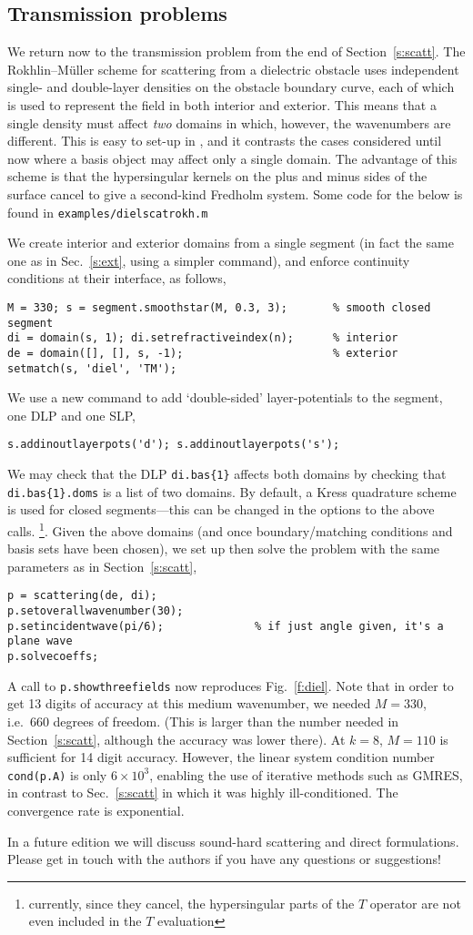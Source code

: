 \subsection{Transmission problems}
\label{s:trans}

We return now to the transmission problem from the end of Section~\ref{s:scatt}.
The Rokhlin--M\"{u}ller scheme \cite{rokh83}
for scattering from a dielectric obstacle
uses independent single- and double-layer densities on the obstacle
boundary curve, each of which is used to represent the field in
both interior and exterior.
This means that a single density must affect
{\em two} domains in which, however, the wavenumbers are different.
This is easy to set-up in \mpspack, and it contrasts the cases considered
until now where a basis object may affect only a single domain.
The advantage of this scheme is that
the hypersingular kernels on the plus and minus sides of the surface
cancel to give a second-kind Fredholm system.
Some code for the below is found in {\tt examples/dielscatrokh.m}

We create interior and exterior domains from a single segment
(in fact the same one as in Sec.~\ref{s:ext}, using a simpler
command), and
enforce continuity conditions at their interface, as follows,
\begin{verbatim}
M = 330; s = segment.smoothstar(M, 0.3, 3);       % smooth closed segment
di = domain(s, 1); di.setrefractiveindex(n);      % interior
de = domain([], [], s, -1);                       % exterior
setmatch(s, 'diel', 'TM');
\end{verbatim}
We use a new command to add `double-sided' layer-potentials to the segment,
one DLP and one SLP,
\begin{verbatim}
s.addinoutlayerpots('d'); s.addinoutlayerpots('s');
\end{verbatim}
We may check that the DLP \verb+di.bas{1}+ affects both domains by
checking that \verb+di.bas{1}.doms+ is a list of two domains.
By default, a Kress quadrature scheme is used for closed segments---this
can be changed in the options to the above calls.%
  \footnote{currently, since they cancel,
    the hypersingular parts of the $T$ operator
    are not even included in the $T$ evaluation}.
Given the above domains (and once boundary/matching conditions and
basis sets have been chosen), we set up then solve the problem
with the same parameters
as in Section~\ref{s:scatt},
\begin{verbatim}
p = scattering(de, di);
p.setoverallwavenumber(30);
p.setincidentwave(pi/6);              % if just angle given, it's a plane wave
p.solvecoeffs;
\end{verbatim}
A call to {\tt p.showthreefields} now reproduces Fig.~\ref{f:diel}.
Note that in order to get 13 digits of accuracy at this medium wavenumber,
we needed $M=330$, i.e.\ 660 degrees of freedom. (This is larger than the number
needed in Section~\ref{s:scatt}, although the accuracy was lower there).
At $k=8$, $M=110$ is sufficient for 14 digit accuracy.
However, the linear system condition number {\tt cond(p.A)} is only
$6\times 10^3$, enabling the use of iterative methods such as GMRES,
in contrast to Sec.~\ref{s:scatt} in which it
was highly ill-conditioned. The convergence rate is exponential.


In a future edition we will discuss
sound-hard scattering and direct formulations.
Please get in touch with the authors if you have any questions
or suggestions!
